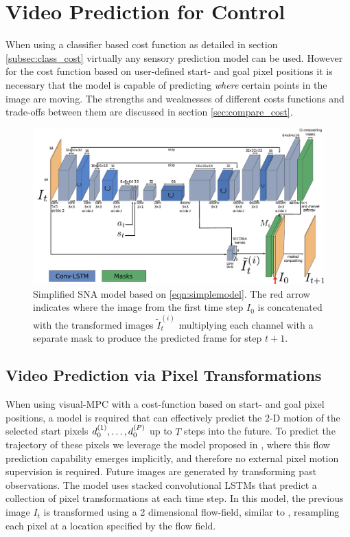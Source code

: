\section{Video Prediction for Control}
When using a classifier based cost function as detailed in section \ref{subsec:class_cost} virtually any sensory prediction model can be used. However for the cost function based on user-defined start- and goal pixel positions it is necessary that the model is capable of predicting \emph{where} certain points in the image are moving. The strengths and weaknesses of different costs functions and trade-offs between them are discussed in section \ref{sec:compare_cost}.

\begin{figure}[t]
    \centering
    \includegraphics[width=\columnwidth]{images_sna/occlusionaware/occlusion_model.pdf}
    \caption{\small{Simplified SNA model based on \autoref{eqn:simplemodel}. The red arrow indicates where the image from the first time step $I_0$ is concatenated with the transformed images $\tilde{I}^{(i)}_t$ multiplying each channel with a separate mask to produce the predicted frame for step $t+1$.  }}      \label{fig:occlusion_model}
\end{figure}


\subsection{Video Prediction via Pixel Transformations}
\label{sec:model}
When using visual-MPC with a cost-function based on start- and goal pixel positions, a model is required that can effectively predict the 2-D motion of the selected start pixels $d_0^{(1)}, \dots, d_0^{(P)}$ up to $T$ steps into the future.
To predict the trajectory of these pixels we leverage the model proposed in \cite{finn_nips}, where this flow prediction capability emerges implicitly, and therefore no external pixel motion supervision is required. Future images are generated by transforming past observations. The model uses stacked convolutional LSTMs that predict a collection of pixel transformations at each time step. In this model, the previous image $I_t$ is transformed using a 2 dimensional flow-field, similar to \cite{zhou2016view}, resampling each pixel at a location specified by the flow field.

